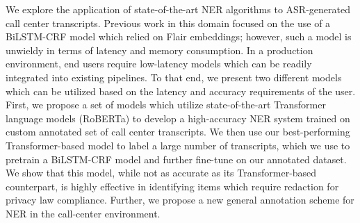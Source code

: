 We explore the application of state-of-the-art NER algorithms to ASR-generated call center transcripts. Previous work in this domain focused on the use of a BiLSTM-CRF model which relied on Flair embeddings; however, such a model is unwieldy in terms of latency and memory consumption. In a production environment, end users require low-latency models which can be readily integrated into existing pipelines. To that end, we present two different models which can be utilized based on the latency and accuracy requirements of the user. First, we propose a set of models which utilize state-of-the-art Transformer language models (RoBERTa) to develop a high-accuracy NER system trained on custom annotated set of call center transcripts. We then use our best-performing Transformer-based model to label a large number of transcripts, which we use to pretrain a BiLSTM-CRF model and further fine-tune on our annotated dataset. We show that this model, while not as accurate as its Transformer-based counterpart, is highly effective in identifying items which require redaction for privacy law compliance. Further, we propose a new general annotation scheme for NER in the call-center environment.
